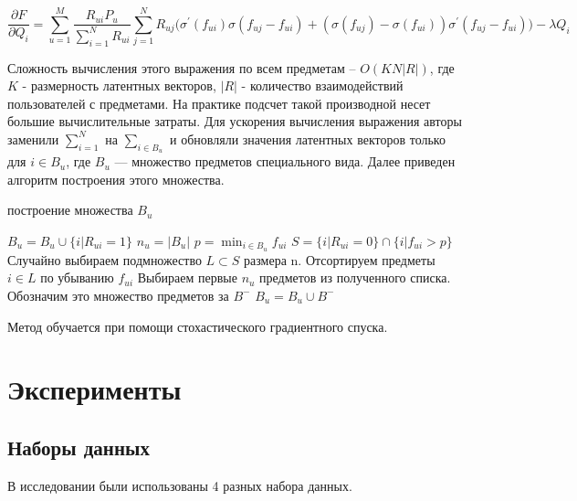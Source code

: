 \documentclass[14pt]{extarticle}
\begin{document}
\begin{equation*}
 \frac{\partial F}{\partial Q_i} = \sum_{u=1}^M\frac{R_{ui} P_u}{\sum_{i=1}^N R_{ui}}\sum_{j=1}^N R_{uj} \Big(\sigma^{\prime}( f_{ui})\sigma(f_{uj} - f_{ui}) + (\sigma(f_{uj}) - \sigma(f_{ui}))\sigma^{\prime}(f_{uj} - f_{ui}) \Big )  - \lambda Q_i
\end{equation*}

Сложность вычисления этого выражения по всем предметам -- $O(KN|R|)$, где $K$ - размерность латентных векторов, $|R|$ -  количество взаимодействий пользователей с предметами. На практике подсчет такой производной несет большие вычислительные затраты. Для ускорения вычисления выражения авторы заменили $\sum_{i=1}^N$ на $\sum_{i \in B_{u}}$ и обновляли значения латентных векторов только для $i \in B_u$, где $B_{u}$ --- множество предметов специального вида. Далее приведен алгоритм построения этого множества.

\begin{algorithm}[h]
\caption{построение множества $B_{u}$}
\begin{algorithmic}[1]
\State $B_u = B_u \cup \{i | R_{ui} = 1 \}$
\State $n_u = |B_u|$
\State $p = \min_{i \in B_u} f_{ui}$
\State $S  = \{i |R_{ui} = 0 \} \cap \{i| f_{ui} > p \}$
\State Случайно выбираем подмножество $L \subset S$ размера n.
\State Отсортируем предметы $i \in L$ по убыванию $f_{ui}$
\State Выбираем первые $n_u$ предметов из полученного списка. Обозначим это множество предметов за $B^{-}$
\State $B_u = B_u \cup B^{-}$  
\end{algorithmic}
\label{alg:setB}
\end{algorithm}

Метод обучается при помощи стохастического градиентного спуска.


\section{Эксперименты}

\subsection{Наборы данных}
В исследовании были использованы 4 разных набора данных.
\end{document}
